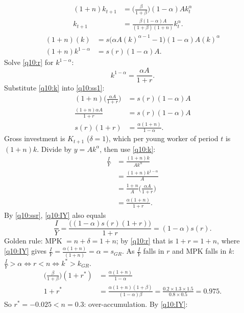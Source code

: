 \begin{sol}
\begin{align}
(1+n)k_{t+1} &= \Big(\frac\beta{1+\beta}\Big)(1-\alpha)Ak_t^\alpha\nonumber\\
k_{t+1} &= \frac{\beta(1-\alpha)A}{(1+\beta)(1+n)}k_t^\alpha. \label{q10:lom1}
\end{align}
\begin{align}
(1+n)(k) &= s\big(\alpha A(k)^{\alpha-1}-1\big)(1-\alpha)A(k)^\alpha\nonumber\\
(1+n)k^{1-\alpha} &= s(r)(1-\alpha)A. \label{q10:ss1}
\end{align}
Solve \eqref{q10:r} for $k^{1-\alpha}$:
\begin{equation}
k^{1-\alpha}=\frac{\alpha A}{1+r}. \label{q10:k}
\end{equation}
Substitute \eqref{q10:k} into \eqref{q10:ss1}:
\begin{align}
(1+n)\Big(\frac{\alpha A}{1+r}\Big) &= s(r)(1-\alpha)A\nonumber\\
\frac{(1+n)\alpha A}{1+r} &= s(r)(1-\alpha)A\nonumber\\
s(r)(1+r) &= \frac{\alpha(1+n)}{1-\alpha}. \label{q10:ssr}
\end{align}
Gross investment is $K_{t+1}$ ($\delta=1$), which per young worker of period $t$ is $(1+n)k$. Divide by $y=Ak^\alpha$, then use
\eqref{q10:k}:
\begin{align}
\frac IY &= \frac{(1+n)k}{Ak^\alpha}\nonumber\\
&= \frac{(1+n)k^{1-\alpha}}{A}\nonumber\\
&= \frac{1+n}{A}\Big(\frac{\alpha A}{1+r}\Big)\nonumber\\
&= \frac{\alpha(1+n)}{1+r}. \label{q10:IY}
\end{align}
By \eqref{q10:ssr}, \eqref{q10:IY} also equals
\[
\frac IY=\frac{\big((1-\alpha)s(r)(1+r)\big)}{1+r}=(1-\alpha)s(r).
\]
Golden rule: MPK $=n+\delta=1+n$; by \eqref{q10:r} that is $1+r=1+n$,
where \eqref{q10:IY} gives $\frac IY=\frac{\alpha(1+n)}{(1+n)}=\alpha=s_{GR}$. As $\frac IY$ falls in $r$ and MPK falls in $k$:
$\frac IY>\alpha\iff r<n\iff k^\ast>k_{GR}$.
\begin{align*}
\Big(\frac\beta{1+\beta}\Big)(1+r^\ast) &= \frac{\alpha(1+n)}{1-\alpha}\\
1+r^\ast &= \frac{\alpha(1+n)(1+\beta)}{(1-\alpha)\beta}=\frac{0.2\times1.3\times1.5}{0.8\times0.5}=0.975 .
\end{align*}
So $r^\ast=-0.025<n=0.3$: over-accumulation. By \eqref{q10:IY}:

\end{sol}
